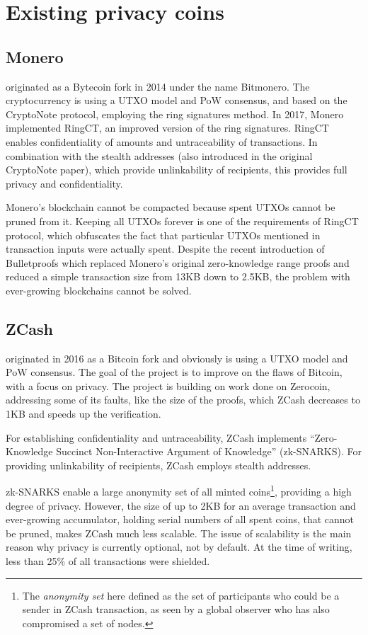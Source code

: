 \documentclass[8pt,fleqn,openany]{book}
\begin{document}
\section{Existing privacy coins}

\subsection{Monero} originated as a Bytecoin fork in 2014 under the name Bitmonero. The cryptocurrency is using a UTXO model and PoW consensus, and based on the CryptoNote protocol\cite{c2}, employing the ring signatures method. In 2017, Monero implemented RingCT\cite{c3}, an improved version of the ring signatures. RingCT enables confidentiality of amounts and untraceability of transactions. In combination with the stealth addresses (also introduced in the original CryptoNote paper), which provide unlinkability of recipients, this provides full privacy and confidentiality.

Monero's blockchain cannot be compacted because spent UTXOs cannot be pruned from it. Keeping all UTXOs forever is one of the requirements of RingCT protocol, which obfuscates the fact that particular UTXOs mentioned in transaction inputs were actually spent. 
Despite the recent introduction of Bulletproofs\cite{c4} which replaced Monero's original zero-knowledge range proofs and reduced a simple transaction size from 13KB down to 2.5KB, the problem with ever-growing blockchains cannot be solved. 

\subsection{ZCash} originated in 2016 as a Bitcoin fork and obviously is using a UTXO model and PoW consensus. The goal of the project is to improve on the flaws of Bitcoin, with a focus on privacy. The project is building on work done on Zerocoin\cite{c5}, addressing some of its faults, like the size of the proofs, which ZCash decreases to 1KB and speeds up the verification.

For establishing confidentiality and untraceability, ZCash implements ``Zero-Knowledge Succinct Non-Interactive Argument of Knowledge'' (zk-SNARKS)\cite{c6}. For providing unlinkability of recipients, ZCash employs stealth addresses.

zk-SNARKS enable a large anonymity set of all minted coins\footnote{The \textit{anonymity set} here defined as the set of participants who could be a sender in ZCash transaction, as seen by a global observer who has also compromised a set of nodes.}, providing a high degree of privacy. However, the size of up to 2KB for an average transaction and ever-growing accumulator, holding serial numbers of all spent coins, that cannot be pruned, makes ZCash much less scalable. The issue of scalability is the main reason why privacy is currently optional, not by default. At the time of writing, less than 25\% of all transactions were shielded.
\end{document}
